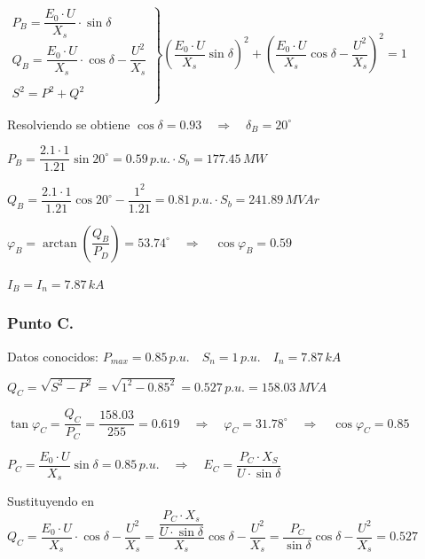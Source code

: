 			\vspace{0.1cm}
			$
			\left.
			\begin{matrix}
				P_B = \dfrac{E_0\cdot U}{X_s}\cdot \sin \delta\\
				Q_B = \dfrac{E_0\cdot U}{X_s}\cdot \cos \delta - \dfrac{U^2}{X_s}\\\\
				S^2 = P^2 + Q^2
			\end{matrix}
			\right\}
			\left(\dfrac{E_0\cdot U}{X_s}\sin \delta\right)^2 + \left(\dfrac{E_0\cdot U}{X_s}\cos \delta - \dfrac{U^2}{X_s}\right)^2 = 1
			$
			
			\vspace{0.1cm}
			Resolviendo se obtiene $\cos \delta = 0.93 \quad \Rightarrow \quad \delta_B = 20^\circ$
			
			\vspace{0.1cm}
			$P_B = \dfrac{2.1\cdot 1}{1.21}\sin 20^\circ = 0.59\,p.u. \cdot S_b = 177.45\,MW$
			
			\vspace{0.1cm}
			$Q_B = \dfrac{2.1\cdot 1}{1.21}\cos 20^\circ - \dfrac{1^2}{1.21} = 0.81\,p.u.\cdot S_b = 241.89\,MV\!Ar$
			
			\vspace{0.1cm}
			$\varphi_B = \arctan\left(\dfrac{Q_B}{P_D}\right) = 53.74^\circ \quad \Rightarrow \quad \cos \varphi_B = 0.59$
			
			\vspace{0.1cm}
			$I_B = I_n = 7.87\,kA$
			
		\subsubsection*{Punto C.}
			Datos conocidos: $P_{max} = 0.85\,p.u.\quad S_n = 1\,p.u.\quad I_n = 7.87\,kA$
			
			\vspace{0.1cm}
			$Q_C = \sqrt{S^2 - P^2} = \sqrt{1^2 - 0.85^2} = 0.527\,p.u. = 158.03\,MV\!A$
			
			\vspace{0.1cm}
			$\tan \varphi_C = \dfrac{Q_C}{P_C} = \dfrac{158.03}{255} = 0.619 \quad \Rightarrow \quad \varphi_C = 31.78^\circ \quad \Rightarrow \quad \cos \varphi_C = 0.85$
			
			\vspace{0.1cm}
			$P_C = \dfrac{E_0\cdot U}{X_s}\sin \delta = 0.85\,p.u. \quad \Rightarrow \quad E_C = \dfrac{P_C \cdot X_S}{U\cdot \sin \delta}$
			
			\vspace{0.1cm}
			Sustituyendo en $Q_C = \dfrac{E_0\cdot U}{X_s}\cdot \cos \delta - \dfrac{U^2}{X_s} = \dfrac{\dfrac{P_C\cdot X_s}{U\cdot \sin \delta}}{X_s}\cos \delta - \dfrac{U^2}{X_s} = \dfrac{P_C}{\sin \delta}\cos \delta - \dfrac{U^2}{X_s} = 0.527$
			

